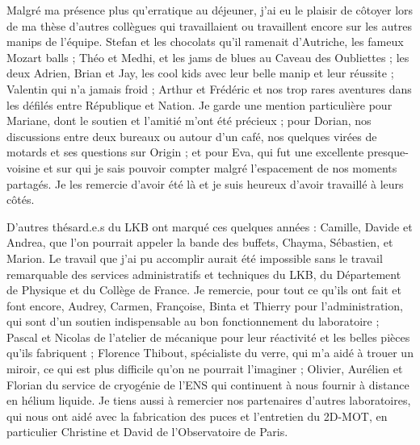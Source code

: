 \bigskip
Malgré ma présence plus qu'erratique au déjeuner, j'ai eu le plaisir de côtoyer lors de ma thèse d'autres collègues qui travaillaient ou travaillent encore sur les autres manips de l'équipe. Stefan et les chocolats qu'il ramenait d'Autriche, les fameux \og Mozart balls \fg{} ; Théo et Medhi, et les jams de blues au Caveau des Oubliettes ; les deux Adrien, Brian et Jay, les cool kids avec leur belle manip et leur réussite ; Valentin qui n'a jamais froid ; Arthur et Frédéric et nos trop rares aventures dans les défilés entre République et Nation.
Je garde une mention particulière pour Mariane, dont le soutien et l'amitié m'ont été précieux ; pour Dorian, nos discussions entre deux bureaux ou autour d'un café, nos quelques virées de motards et ses questions sur Origin ; et pour Eva, qui fut une excellente presque-voisine et sur qui je sais pouvoir compter malgré l'espacement de nos moments partagés.
Je les remercie d'avoir été là et je suis heureux d'avoir travaillé à leurs côtés.

\bigskip
D'autres thésard.e.s du LKB ont marqué ces quelques années : Camille, Davide et Andrea, que l'on pourrait appeler la bande des buffets, Chayma, Sébastien, et Marion.
Le travail que j'ai pu accomplir aurait été impossible sans le travail remarquable des services administratifs et techniques du LKB, du Département de Physique et du Collège de France.
Je remercie, pour tout ce qu'ils ont fait et font encore, Audrey, Carmen, Françoise, Binta et Thierry pour l'administration, qui sont d'un soutien indispensable au bon fonctionnement du laboratoire ; Pascal et Nicolas de l'atelier de mécanique pour leur réactivité et les belles pièces qu'ils fabriquent ; Florence Thibout, spécialiste du verre, qui m'a aidé à trouer un miroir, ce qui est plus difficile qu'on ne pourrait l'imaginer ; Olivier, Aurélien et Florian du service de cryogénie de l'ENS qui continuent à nous fournir à distance en hélium liquide.
Je tiens aussi à remercier nos partenaires d'autres laboratoires, qui nous ont aidé avec la fabrication des puces et l'entretien du 2D-MOT, en particulier Christine et David de l'Observatoire de Paris.

